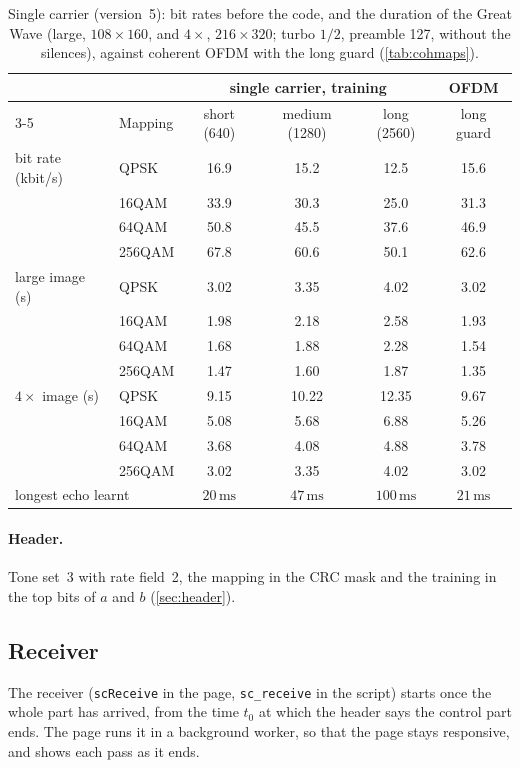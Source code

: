 \documentclass[11pt,a4paper]{article}
\newcommand{\ms}{\,\mathrm{ms}}
\newcommand{\code}[1]{\texttt{#1}}
\theoremstyle{remark}
\begin{document}
\begin{table}[ht]
\centering
\caption{Single carrier (version~5): bit rates before the code, and the duration of the Great Wave (large, $108 \times 160$, and $4\times$, $216 \times 320$; turbo $1/2$, preamble 127, without the silences), against coherent OFDM with the long guard (\cref{tab:cohmaps}).}
\label{tab:scrates}
\small
\begin{tabular}{llcccc}
\toprule
& & \multicolumn{3}{c}{single carrier, training} & OFDM\\
\cmidrule(lr){3-5}
& Mapping & short (640) & medium (1280) & long (2560) & long guard\\
\midrule
bit rate (kbit/s) & QPSK & 16.9 & 15.2 & 12.5 & 15.6\\
 & 16QAM & 33.9 & 30.3 & 25.0 & 31.3\\
 & 64QAM & 50.8 & 45.5 & 37.6 & 46.9\\
 & 256QAM & 67.8 & 60.6 & 50.1 & 62.6\\
\midrule
large image (s) & QPSK & 3.02 & 3.35 & 4.02 & 3.02\\
 & 16QAM & 1.98 & 2.18 & 2.58 & 1.93\\
 & 64QAM & 1.68 & 1.88 & 2.28 & 1.54\\
 & 256QAM & 1.47 & 1.60 & 1.87 & 1.35\\
\midrule
$4\times$ image (s) & QPSK & 9.15 & 10.22 & 12.35 & 9.67\\
 & 16QAM & 5.08 & 5.68 & 6.88 & 5.26\\
 & 64QAM & 3.68 & 4.08 & 4.88 & 3.78\\
 & 256QAM & 3.02 & 3.35 & 4.02 & 3.02\\
\midrule
\multicolumn{2}{l}{longest echo learnt} & $20\ms$ & $47\ms$ & $100\ms$ & $21\ms$\\
\bottomrule
\end{tabular}
\end{table}

\paragraph{Header.}
Tone set~3 with rate field~2, the mapping in the CRC mask and the training in the top bits of $a$ and $b$ (\cref{sec:header}).

\subsection{Receiver}
\label{sec:scrx}
The receiver (\code{scReceive} in the page, \code{sc\_receive} in the script) starts once the whole part has arrived, from the time $t_0$ at which the header says the control part ends. The page runs it in a background worker, so that the page stays responsive, and shows each pass as it ends.
\end{document}
